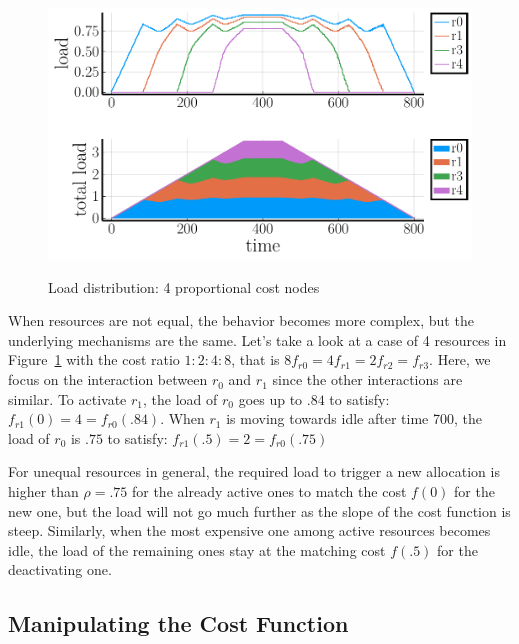 \begin{figure}
  \begin{center}
    \includegraphics[width=1.0\columnwidth]{proportional_nodes.pdf}
    \vspace{-2.0ex}
    \caption{Load distribution: 4 proportional cost nodes}
    \label{fig:4node-ratio}
  \end{center}
\end{figure}

When resources are not equal, the behavior becomes more complex, but
the underlying mechanisms are the same.
Let's take a look at a case of 4 resources in Figure~\ref{fig:4node-ratio}
with the cost ratio $1:2:4:8$,
that is $8 f_{r0} = 4 f_{r1} = 2 f_{r2} = f_{r3}$.
Here, we focus on the interaction between $r_{0}$ and $r_{1}$ since
the other interactions are similar.
To activate $r_{1}$, the load of $r_{0}$ goes up to $.84$ to satisfy:
$f_{r1}(0) = 4 = f_{r0}(.84)$.
When $r_{1}$ is moving towards idle after time 700, the load
of $r_{0}$ is $.75$ to satisfy: $f_{r1}(.5) = 2 = f_{r0}(.75)$

For unequal resources in general, the required load to trigger a new
allocation is higher than $\rho = .75$ for the already
active ones to match the cost $f(0)$ for the new one, but the load
will not go much further as the slope of the cost function is steep.
Similarly, when the most expensive one among active resources becomes
idle, the load of the remaining ones stay at the matching cost 
$f(.5)$ for the deactivating one.


\subsection{Manipulating the Cost Function}
\label{sec:variation}

